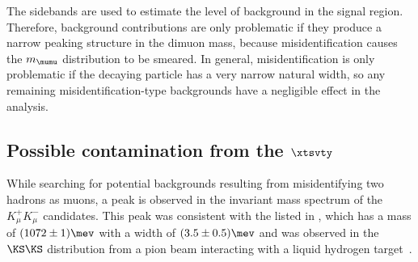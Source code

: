 

The sidebands are used to estimate the level of background in the signal region.
Therefore, background
contributions are only problematic if they produce a narrow peaking structure in the dimuon mass,
because misidentification causes the $m_{\mumu}$ distribution to be smeared.
In general, misidentification is only problematic if the decaying particle has a very narrow
natural width, so any remaining misidentification-type backgrounds have a negligible effect in the
analysis.


\subsection[Possible contamination from the \xtsvty]
{Possible contamination from the $\boldsymbol{\xtsvty}$}
\label{sec:x1070}
While searching for potential backgrounds resulting from misidentifying two hadrons as muons, a
peak is observed in the invariant mass spectrum of the $K_\mu^+K_\mu^-$ candidates.
This peak was consistent with the \xtsvty listed in , which has a mass of
$(1072\pm1)\mev$ with a width of $(3.5\pm0.5)\mev$ and was observed in the $\KS\KS$ distribution
from a pion beam interacting with a liquid hydrogen target~\cite{x1070vlad}.

